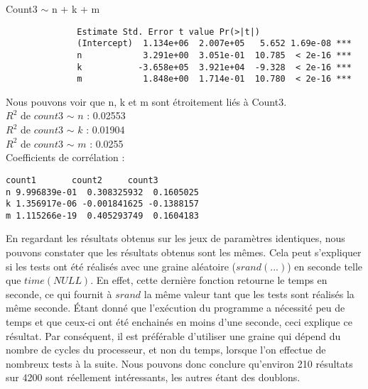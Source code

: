 Count3 $\sim$ n + k + m
\begin{verbatim}
              Estimate Std. Error t value Pr(>|t|)    
              (Intercept)  1.134e+06  2.007e+05   5.652 1.69e-08 ***
              n            3.291e+00  3.051e-01  10.785  < 2e-16 ***
              k           -3.658e+05  3.921e+04  -9.328  < 2e-16 ***
              m            1.848e+00  1.714e-01  10.780  < 2e-16 ***
\end{verbatim}
Nous pouvons voir que n, k et m sont étroitement liés à Count3.\\
$R^2$ de $count3$ $\sim$ $n$ : 0.02553 \\
$R^2$ de $count3$ $\sim$ $k$ : 0.01904 \\
$R^2$ de $count3$ $\sim$ $m$ : 0.0255\\


Coefficients de corrélation :
\begin{verbatim}
count1       count2     count3
n 9.996839e-01  0.308325932  0.1605025
k 1.356917e-06 -0.001841625 -0.1388157
m 1.115266e-19  0.405293749  0.1604183
\end{verbatim}


En regardant les résultats obtenus sur les jeux de paramètres identiques, nous pouvons constater que les résultats obtenus sont les mêmes. Cela peut s'expliquer si les tests ont été réalisés avec une graine aléatoire ($srand(...)$) en seconde telle que $time(NULL)$. En effet, cette dernière fonction retourne le temps en seconde, ce qui fournit à $srand$ la même valeur tant que les tests sont réalisés la même seconde. Étant donné que l'exécution du programme a nécessité peu de temps et que ceux-ci ont été enchainés en moins d'une seconde, ceci explique ce résultat. Par conséquent, il est préférable d'utiliser une graine qui dépend du nombre de cycles du processeur, et non du temps, lorsque l'on effectue de nombreux tests à la suite. Nous pouvons donc conclure qu'environ 210 résultats sur 4200 sont réellement intéressants, les autres étant des doublons.
